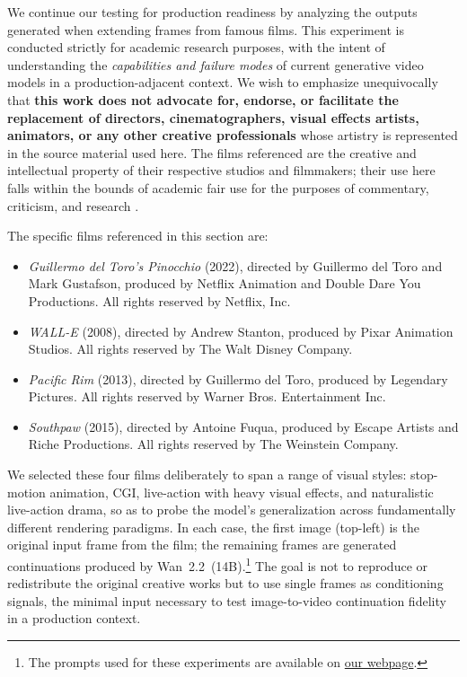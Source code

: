 \documentclass[sigconf]{acmart}
\begin{document}
We continue our testing for production readiness by analyzing the outputs
generated when extending frames from famous films. This experiment is
conducted strictly for academic research purposes, with the intent of
understanding the \textit{capabilities and failure modes} of current
generative video models in a production-adjacent context. We wish to
emphasize unequivocally that \textbf{this work does not advocate for,
    endorse, or facilitate the replacement of directors, cinematographers,
    visual effects artists, animators, or any other creative professionals}
whose artistry is represented in the source material used here. The films
referenced are the creative and intellectual property of their respective
studios and filmmakers; their use here falls within the bounds of academic
fair use for the purposes of commentary, criticism, and research
\cite{usc2011fairuse}.

The specific films referenced in this section are:
\begin{itemize}
    \item \textit{Guillermo del Toro's Pinocchio} (2022), directed by
          Guillermo del Toro and Mark Gustafson, produced by Netflix Animation
          and Double Dare You Productions. All rights reserved by Netflix, Inc.
    \item \textit{WALL-E} (2008), directed by Andrew Stanton, produced
          by Pixar Animation Studios. All rights reserved by The Walt Disney
          Company.
    \item \textit{Pacific Rim} (2013), directed by Guillermo del Toro,
          produced by Legendary Pictures. All rights reserved by Warner Bros.
          Entertainment Inc.
    \item \textit{Southpaw} (2015), directed by Antoine Fuqua, produced
          by Escape Artists and Riche Productions. All rights reserved by
          The Weinstein Company.
\end{itemize}

We selected these four films deliberately to span a range of visual
styles: stop-motion animation, CGI, live-action with heavy visual
effects, and naturalistic live-action drama, so as to probe the
model's generalization across fundamentally different rendering
paradigms. In each case, the first image (top-left) is the original
input frame from the film; the remaining frames are generated
continuations produced by Wan~2.2~(14B).\footnote{The prompts used
    for these experiments are available on
    \href{https://t-cent.github.io/Character-Consistency/list-of-prompts.html\#image-to-video}{our
        webpage}.} The goal is not to reproduce or redistribute the original
creative works but to use single frames as conditioning signals, the
minimal input necessary to test image-to-video continuation fidelity
in a production context.
\end{document}
